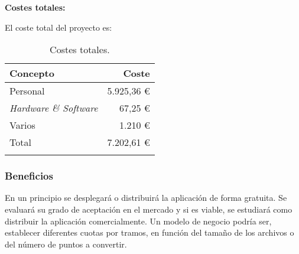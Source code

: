 \textbf{Costes totales:}

El coste total del proyecto es:

\begin{longtable}[]{@{}lr@{}}
\toprule
\begin{minipage}[b]{0.4\columnwidth}\raggedright\strut
\textbf{Concepto}\strut
\end{minipage} & \begin{minipage}[b]{0.22\columnwidth}\raggedright\strut
\textbf{Coste}\strut
\end{minipage}\tabularnewline
\midrule
\endhead
\begin{minipage}[t]{0.4\columnwidth}\raggedright\strut
Personal\strut
\end{minipage} & \begin{minipage}[t]{0.22\columnwidth}\raggedright\strut
5.925,36 \euro{}\strut
\end{minipage}\tabularnewline
\begin{minipage}[t]{0.4\columnwidth}\raggedright\strut
\emph{Hardware \& Software}\strut
\end{minipage} & \begin{minipage}[t]{0.22\columnwidth}\raggedright\strut
67,25 \euro{}\strut
\end{minipage}\tabularnewline
\begin{minipage}[t]{0.4\columnwidth}\raggedright\strut
Varios\strut
\end{minipage} & \begin{minipage}[t]{0.22\columnwidth}\raggedright\strut
1.210 \euro{}\strut
\end{minipage}\tabularnewline
\midrule
\begin{minipage}[t]{0.4\columnwidth}\raggedright\strut
Total\strut
\end{minipage} & \begin{minipage}[t]{0.22\columnwidth}\raggedright\strut
7.202,61 \euro{}\strut
\end{minipage}\tabularnewline
\bottomrule
\caption{Costes totales.}
\end{longtable}

\subsubsection{Beneficios}

En un principio se desplegará o distribuirá la aplicación de forma gratuita. Se evaluará su grado de aceptación en el mercado y si es viable, se estudiará como distribuir la aplicación comercialmente. Un modelo de negocio podría ser, establecer diferentes cuotas por tramos, en función del tamaño de los archivos o del número de puntos a convertir.

